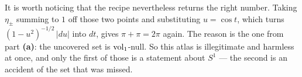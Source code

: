 \begin{exercisesolution}
\begin{enumerate}[label=\textbf{(\alph*)}]
    It is worth noticing that the recipe nevertheless returns the right number. Taking
    $\eta_\pm$ summing to $1$ off those two points and substituting $u = \cos t$, which turns
    $(1-u^2)^{-1/2}\,\lvert du\rvert$ into $dt$, gives $\pi + \pi = 2\pi$ again. The reason is the
    one from part \textbf{(a)}: the uncovered set is $\operatorname{vol}_1$-null. So this atlas is illegitimate
    and harmless at once, and only the first of those is a statement about $S^1$ --- the second
    is an accident of the set that was missed.
\end{enumerate}
\end{exercisesolution}
